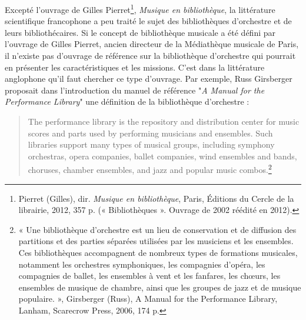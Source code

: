 Excepté l'ouvrage de Gilles Pierret\footnote{Pierret (Gilles), dir. \textit{Musique en bibliothèque}, Paris, Éditions du Cercle de la librairie, 2012, 357 p. (« Bibliothèques ». Ouvrage de 2002 réédité en 2012).}, \textit{Musique en bibliothèque}, la littérature scientifique francophone a peu traité le sujet des bibliothèques d'orchestre et de leurs bibliothécaires.
Si le concept de bibliothèque musicale a été défini par l'ouvrage de Gilles Pierret, ancien directeur de la Médiathèque musicale de Paris, il n'existe pas d'ouvrage de référence sur la bibliothèque d'orchestre qui pourrait en présenter les caractéristiques et les missions.
C'est dans la littérature anglophone qu'il faut chercher ce type d'ouvrage.
Par exemple, Russ Girsberger proposait dans l'introduction du manuel de référence "\textit{A Manual for the Performance Library}" une définition de la bibliothèque d'orchestre :
\begin{quote}
	The performance library is the repository and distribution center for music scores and parts used by performing musicians and ensembles. Such libraries support many types of musical groups, including symphony orchestras, opera companies, ballet companies, wind ensembles and bands, choruses, chamber ensembles, and jazz and popular music combos.\footnote{« Une bibliothèque d'orchestre est un lieu de conservation et de diffusion des partitions et des parties séparées utilisées par les musiciens et l\textit{}es ensembles. Ces bibliothèques accompagnent de nombreux types de formations musicales, notamment les orchestres symphoniques, les compagnies d'opéra, les compagnies de ballet, les ensembles à vent et les fanfares, les chœurs, les ensembles de musique de chambre, ainsi que les groupes de jazz et de musique populaire. », Girsberger (Russ), A Manual for the Performance Library, Lanham, Scarecrow Press, 2006, 174 p.}
\end{quote} 

